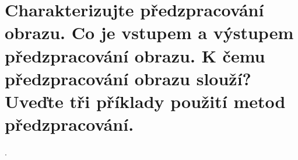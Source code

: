 \section{Charakterizujte předzpracování obrazu. Co je vstupem a výstupem předzpracování obrazu. K čemu předzpracování 
obrazu slouží? Uveďte tři příklady použití metod předzpracování.}.